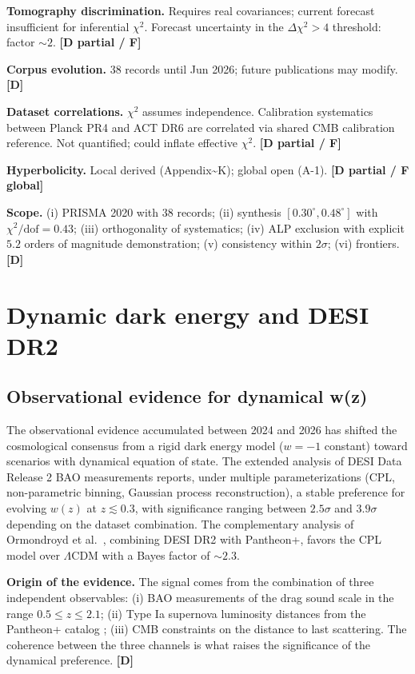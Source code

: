 ﻿\documentclass[11pt,letterpaper]{article}
\begin{document}
\textbf{Tomography discrimination.} Requires real covariances; current forecast insufficient for inferential $\chi^2$. Forecast uncertainty in the $\Delta\chi^2 > 4$ threshold: factor $\sim 2$. \textbf{[D partial / F]}

\textbf{Corpus evolution.} 38 records until Jun 2026; future publications may modify. \textbf{[D]}

\textbf{Dataset correlations.} $\chi^2$ assumes independence. Calibration systematics between Planck PR4 and ACT DR6 are correlated via shared CMB calibration reference. Not quantified; could inflate effective $\chi^2$. \textbf{[D partial / F]}

\textbf{Hyperbolicity.} Local derived (Appendix\textasciitilde{}K); global open (A-1). \textbf{[D partial / F global]}

\textbf{Scope.} (i) PRISMA 2020 with 38 records; (ii) synthesis $[0{.}30^\circ, 0{.}48^\circ]$ with $\chi^2/\mathrm{dof} = 0{.}43$; (iii) orthogonality of systematics; (iv) ALP exclusion with explicit $5{.}2$ orders of magnitude demonstration; (v) consistency within $2\sigma$; (vi) frontiers. \textbf{[D]}

\section{Dynamic dark energy and DESI DR2}
\subsection{Observational evidence for dynamical w(z)}
The observational evidence accumulated between 2024 and 2026 has shifted the cosmological consensus from a rigid dark energy model ($w = -1$ constant) toward scenarios with dynamical equation of state. The extended analysis of DESI Data Release 2 BAO measurements \cite{Lodha2025} reports, under multiple parameterizations (CPL, non-parametric binning, Gaussian process reconstruction), a stable preference for evolving $w(z)$ at $z \lesssim 0{.}3$, with significance ranging between $2{.}5\sigma$ and $3{.}9\sigma$ depending on the dataset combination. The complementary analysis of Ormondroyd et al.\ \cite{Ormondroyd2025}, combining DESI DR2 with Pantheon+, favors the CPL model over $\Lambda$CDM with a Bayes factor of $\sim 2{.}3$.

\textbf{Origin of the evidence.} The signal comes from the combination of three independent observables: (i) BAO measurements of the drag sound scale in the range $0{.}5 \le z \le 2{.}1$; (ii) Type Ia supernova luminosity distances from the Pantheon+ catalog \cite{Brout2022}; (iii) CMB constraints on the distance to last scattering. The coherence between the three channels is what raises the significance of the dynamical preference. \textbf{[D]}
\end{document}
